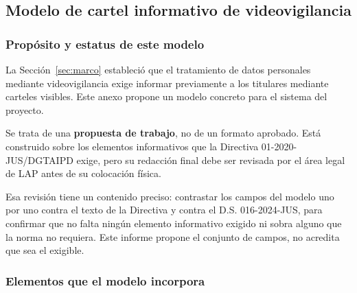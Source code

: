 %
\subsection{Modelo de cartel informativo de videovigilancia}
\label{anx:cartel}

\subsubsection{Propósito y estatus de este modelo}

La Sección~\ref{sec:marco} estableció que el tratamiento de datos
personales mediante videovigilancia exige informar previamente a los
titulares mediante carteles visibles. Este anexo propone un modelo
concreto para el sistema del proyecto.

Se trata de una \textbf{propuesta de
trabajo}, no de un formato aprobado. Está construido sobre los elementos
informativos que la Directiva 01-2020-JUS/DGTAIPD exige, pero su
redacción final debe ser revisada por el área legal de LAP antes de su
colocación física.

Esa revisión tiene un contenido preciso: contrastar los campos del modelo
uno por uno contra el texto de la Directiva y contra el D.S.
016-2024-JUS, para confirmar que no falta ningún elemento informativo
exigido ni sobra alguno que la norma no requiera. Este informe propone el
conjunto de campos, no acredita que sea el exigible.

\subsubsection{Elementos que el modelo incorpora}

